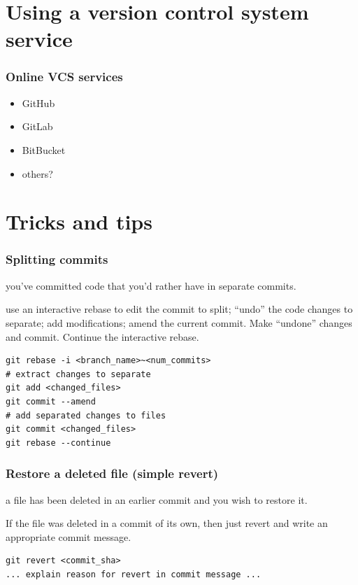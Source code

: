 \documentclass{git_course}
\begin{document}
\section{Using a version control system service}

\begin{frame}
    \frametitle{Online VCS services}
    \begin{itemize}
        \item GitHub
        \item GitLab
        \item BitBucket
        \item others?
    \end{itemize}
\end{frame}


\section{Tricks and tips}

\begin{frame}[fragile]
    \frametitle{Splitting commits}
     you've committed code that you'd rather have in
        separate commits.

     use an interactive rebase to edit the commit
        to split; ``undo'' the code changes to separate; add
        modifications; amend the current commit.
        Make ``undone'' changes and commit.  Continue
        the interactive rebase.
\begin{lstlisting}
git rebase -i <branch_name>~<num_commits>
# extract changes to separate
git add <changed_files>
git commit --amend
# add separated changes to files
git commit <changed_files>
git rebase --continue
\end{lstlisting}

\end{frame}

\begin{frame}[fragile]
    \frametitle{Restore a deleted file (simple revert)}
     a file has been deleted in an earlier commit and you wish
    to restore it.

     If the file was deleted in a commit of its own, then
    just revert and write an appropriate commit message.
\begin{lstlisting}
git revert <commit_sha>
... explain reason for revert in commit message ...
\end{lstlisting}
\end{frame}
\end{document}
